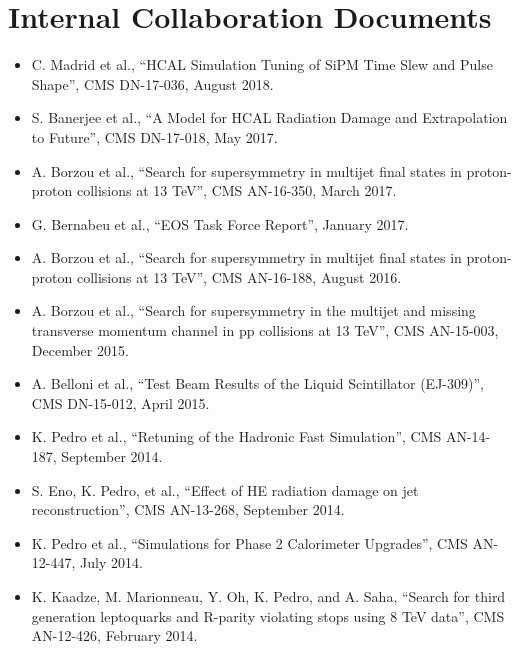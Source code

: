 \section{Internal Collaboration Documents}
\begin{itemize}[leftmargin=12pt]
\item C. Madrid et al., ``HCAL Simulation Tuning of SiPM Time Slew and Pulse Shape'', CMS DN-17-036, August 2018.
\item S. Banerjee et al., ``A Model for HCAL Radiation Damage and Extrapolation to Future'', CMS DN-17-018, May 2017.
\ifdefined\longestflag
\item A. Borzou et al., ``Search for supersymmetry in multijet final states in proton-proton collisions at 13 TeV'', CMS AN-16-350, March 2017.
\fi
\item G. Bernabeu et al., ``EOS Task Force Report'', January 2017.
\ifdefined\longestflag
\item A. Borzou et al., ``Search for supersymmetry in multijet final states in proton-proton collisions at 13 TeV'', CMS AN-16-188, August 2016.
\item A. Borzou et al., ``Search for supersymmetry in the multijet and missing transverse momentum channel in pp collisions at 13 TeV'', CMS AN-15-003, December 2015.
\fi
\item A. Belloni et al., ``Test Beam Results of the Liquid Scintillator (EJ-309)'', CMS DN-15-012, April 2015.
\item K. Pedro et al., ``Retuning of the Hadronic Fast Simulation'', CMS AN-14-187, September 2014.
\item S. Eno, K. Pedro, et al., ``Effect of HE radiation damage on jet reconstruction'', CMS AN-13-268, September 2014.
\item K. Pedro et al., ``Simulations for Phase 2 Calorimeter Upgrades'', CMS AN-12-447, July 2014.
\ifdefined\longestflag
\item K. Kaadze, M. Marionneau, Y. Oh, K. Pedro, and A. Saha, ``Search for third generation leptoquarks and R-parity violating stops using 8 TeV data'', CMS AN-12-426, February 2014.
\fi
\end{itemize}
\fi